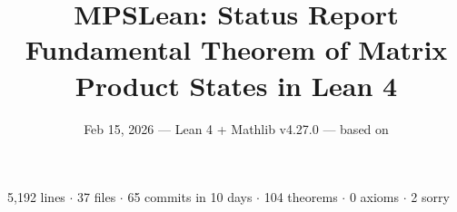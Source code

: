 \documentclass[aspectratio=169,10pt]{beamer}
\title{\textbf{MPSLean: Status Report\\Fundamental Theorem of Matrix Product States in Lean 4}}
\subtitle{{\small Feb 15, 2026 --- Lean 4 + Mathlib v4.27.0 --- based on \cite{Perez-Garcia2007Matrix,Wolf2012Quantum,Evans1978Spectral}}}
\date{}
\author{}
\begin{document}

{%
\begin{frame}
    \vspace{-1.5em}
    \maketitle
    \vspace{-3em}
    \begin{center}
        {\footnotesize
            \textcolor{dimwhite}{5{,}192 lines $\cdot$
            37 files $\cdot$
            65 commits in 10 days $\cdot$
            \textcolor{leangreen}{104 theorems} $\cdot$
            \textcolor{leangreen}{0 axioms} $\cdot$
            \textcolor{amber}{2 sorry}}}
    \end{center}
\end{frame}
}
\end{document}
